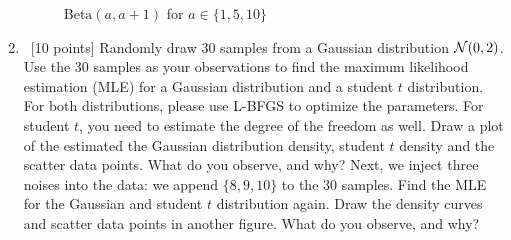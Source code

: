 \documentclass[12pt, fullpage,letterpaper]{article}
\begin{document}
\begin{enumerate}
{\begin{figure}[H]
\begin{center}
\begin{minipage}{0.4\textwidth}
     \caption{{\footnotesize $\text{Beta}(a,a+1)$ for $a\in\{1,5,10\}$}}\label{Fig.2}
 \end{minipage}
 \end{center}
\end{figure} }
\vspace{-1cm}	
	\item~[10 points] Randomly draw 30 samples from a Gaussian distribution $\mathcal{N}(0, 2)$. Use the 30 samples as your observations to find the maximum likelihood estimation (MLE) for a Gaussian distribution and a student $t$ distribution. For both distributions, please use L-BFGS to optimize the parameters. For student $t$, you need to estimate the degree of the freedom as well. Draw a plot of the estimated the Gaussian distribution density, student $t$ density and the scatter data points. What do you observe, and why? Next, we inject three noises into the data: we append $\{8, 9, 10\}$ to the $30$ samples. Find the MLE for the Gaussian and student $t$ distribution again. Draw the density curves and scatter data points in another figure. What do you observe, and why? 


\end{enumerate}
\end{document}

